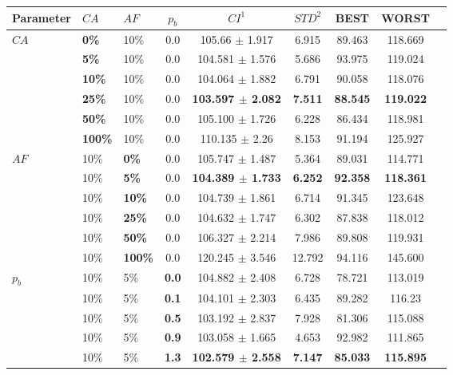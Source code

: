 \begin{table}
    \centering
    \begin{tabular}{|l|l|l|c||c|c|c|c|c|}
    \hline
    Parameter & $CA$ & $AF$ & $p_b$ & $CI^1$ & $STD^2$ &BEST & WORST \\
    \hline
    $CA$ & \textbf{0\%} & 10\% & 0.0 & 105.66 $\pm$ 1.917 & 6.915 & 89.463 & 118.669\\
    ~ & \textbf{5\%} & 10\% & 0.0 & 104.581 $\pm$ 1.576 & 5.686 & 93.975 & 119.024\\
    ~ & \textbf{10\%} & 10\% & 0.0 & 104.064 $\pm$ 1.882 & 6.791 & 90.058 & 118.076\\
    ~ & \textbf{25\%} & 10\% & 0.0 & \textbf{103.597 $\pm$ 2.082} & \textbf{7.511} & \textbf{88.545} & \textbf{119.022}\\
    ~ & \textbf{50\%} & 10\% & 0.0 & 105.100 $\pm$ 1.726 & 6.228 & 86.434 & 118.981\\
    ~ & \textbf{100\%} & 10\% & 0.0 & 110.135 $\pm$ 2.26 & 8.153 & 91.194 & 125.927\\
    \hline
    $AF$ & 10\% & \textbf{0\%} & 0.0 & 105.747 $\pm$ 1.487 & 5.364& 89.031 & 114.771\\
    ~ & 10\% & \textbf{5\%} & 0.0 & \textbf{104.389 $\pm$ 1.733} & \textbf{6.252}& \textbf{92.358} & \textbf{118.361}\\
    ~ & 10\% & \textbf{10\%} & 0.0 & 104.739 $\pm$ 1.861 & 6.714 & 91.345 & 123.648\\
    ~ & 10\% & \textbf{25\%} & 0.0 & 104.632 $\pm$ 1.747 & 6.302 & 87.838 & 118.012\\
    ~ & 10\% & \textbf{50\%} & 0.0 & 106.327 $\pm$ 2.214 & 7.986 & 89.808 & 119.931\\
    ~ & 10\% & \textbf{100\%} & 0.0 & 120.245 $\pm$ 3.546 & 12.792 & 94.116 & 145.600\\
    \hline
    $p_b$ & 10\% & 5\% & \textbf{0.0} & 104.882 $\pm$ 2.408 & 6.728 & 78.721 & 113.019\\
    ~ & 10\% & 5\% & \textbf{0.1} & 104.101 $\pm$ 2.303 & 6.435 &89.282 & 116.23\\
    ~ & 10\% & 5\% & \textbf{0.5} & 103.192 $\pm$ 2.837 & 7.928 & 81.306 & 115.088\\
    ~ & 10\% & 5\% & \textbf{0.9} & 103.058 $\pm$ 1.665 & 4.653 & 92.982 & 111.865\\
    ~ & 10\% & 5\% & \textbf{1.3} & \textbf{102.579 $\pm$ 2.558} & \textbf{7.147} & \textbf{85.033} & \textbf{115.895}\\
    

\end{tabular}
\end{table}
